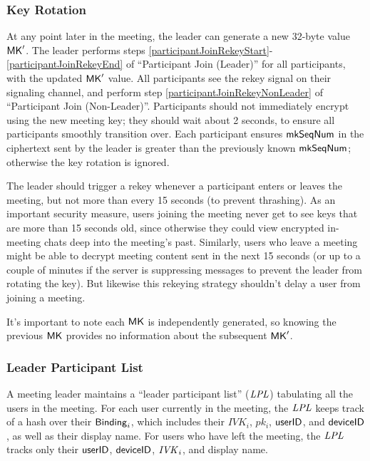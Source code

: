 \subsubsection{Key Rotation}
\label{subsubsec:keyrotation}
At any point later in the meeting, the leader can generate a new 32-byte value ${\sf MK}'$. The leader
performs steps \ref{participantJoinRekeyStart}-\ref{participantJoinRekeyEnd} of ``Participant Join
(Leader)'' for all participants, with the updated ${\sf MK}'$ value. All participants see the rekey
signal on their signaling channel, and perform step \ref{participantJoinRekeyNonLeader} of
``Participant Join (Non-Leader)''. Participants should not immediately encrypt using the new meeting
key; they should wait about 2 seconds, to ensure all participants smoothly transition over. Each
participant ensures $\mathsf{mkSeqNum}$ in the ciphertext sent by the leader is greater than the
previously known $\mathsf{mkSeqNum}$; otherwise the key rotation is ignored.

The leader should trigger a rekey whenever a participant enters or leaves the meeting, but not more
than every 15 seconds (to prevent thrashing). As an important security measure, users joining the
meeting never get to see keys that are more than 15 seconds old, since otherwise they could view
encrypted in-meeting chats deep into the meeting's past. Similarly, users who leave a meeting might
be able to decrypt meeting content sent in the next 15 seconds (or up to a couple of minutes if the
server is suppressing messages to prevent the leader from rotating the key). But likewise this
rekeying strategy shouldn't delay a user from joining a meeting.

It's important to note each ${\sf MK}$ is independently generated, so knowing the previous ${\sf MK}$ provides no information about the subsequent ${\sf MK}'$.

\subsubsection{Leader Participant List}\label{subsubsec:lpl}

A meeting leader maintains a ``leader participant list'' ($\mathit{LPL}$) tabulating all the users in the meeting. For each user currently in the meeting, the $\mathit{LPL}$ keeps track of a hash over their ${\sf Binding}_i$, which includes their $IVK_i$, $pk_i$, $\mathsf{userID}$, and ${\sf deviceID}$, as well as their display name. For users who have left the meeting, the $\mathit{LPL}$ tracks only their $\mathsf{userID}$, ${\sf deviceID}$, $\mathit{IVK}_i$, and display name.

